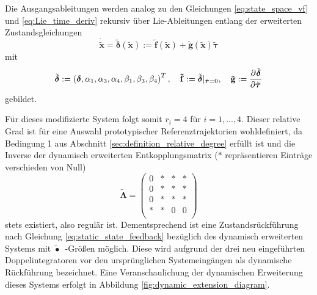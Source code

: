 Die Ausgangsableitungen werden analog zu den Gleichungen \eqref{eq:state_space_vf} und \eqref{eq:Lie_time_deriv} rekursiv über Lie-Ableitungen entlang der erweiterten Zustandsgleichungen 
\begin{equation}
	\dot{\tilde{\mathbf{x}}} = \tilde{\boldsymbol{\delta}}(\tilde{\mathbf{x}}) := \mathbf{\tilde{f}}(\tilde{\mathbf{x}}) + \mathbf{\tilde{g}}(\tilde{\mathbf{x}}) \tilde{\boldsymbol{\tau}}
\end{equation}
mit
\begin{align}
	\tilde{\boldsymbol{\delta}} :=
	\left(\boldsymbol{\delta},
		\alpha_1,
		\alpha_3,
		\alpha_4,
		\beta_1,
		\beta_3,
		\beta_4 \right)^T, \quad
	\mathbf{\tilde{f}} := \tilde{\boldsymbol{\delta}}|_{\tilde{\boldsymbol{\tau}} = 0}, \quad
	\mathbf{\tilde{g}} := \frac{\partial^{}\tilde{\boldsymbol{\delta}}}{\partial{\tilde{\boldsymbol{\tau}}}^{}}
\end{align}
gebildet.

Für dieses modifizierte System folgt somit $r_i = 4$ für $i = 1, ..., 4$. Dieser relative Grad ist für eine Auswahl prototypischer Referenztrajektorien wohldefiniert, da Bedingung 1 aus Abschnitt \ref{sec:definition_relative_degree} erfüllt ist und die Inverse der dynamisch erweiterten Entkopplungsmatrix ($*$ repräsentieren Einträge verschieden von Null)
\begin{equation}
	\tilde{\boldsymbol{\Lambda}} =
	\left(\begin{matrix}
		0 & * & * & * \\
		0 & * & * & * \\
		0 & * & * & * \\
		* & * & 0 & 0 \\
	\end{matrix}\right)
\end{equation}
stets existiert, also regulär ist. Dementsprechend ist eine Zustandsrückführung nach Gleichung \eqref{eq:static_state_feedback} bezüglich des dynamisch erweiterten Systems mit $\tilde{\bullet}$~-Größen möglich. Diese wird aufgrund der drei neu eingeführten Doppelintegratoren vor den ursprünglichen Systemeingängen als dynamische Rückführung bezeichnet. Eine Veranschaulichung der dynamischen Erweiterung dieses Systems erfolgt in Abbildung \ref{fig:dynamic_extension_diagram}.


